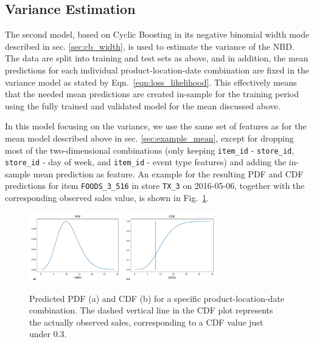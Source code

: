 \documentclass[BCOR=1mm, DIV=calc,10pt,
twoside=true,
twocolumn,
headings=normal]{scrartcl}
\newcommand{\fig}{Fig.~}
\newcommand{\eqn}{Eqn.~}
\begin{document}
\subsection{Variance Estimation}

The second model, based on Cyclic Boosting in its negative binomial width mode described in sec. \ref{sec:cb_width}, is used to estimate the variance of the NBD. The data are split into training and test sets as above, and in addition, the mean predictions for each individual product-location-date combination are fixed in the variance model as stated by \eqn \eqref{eqn:loss_likelihood}. This effectively means that the needed mean predictions are created in-sample for the training period using the fully trained and validated model for the mean discussed above.

\noindent
In this model focusing on the variance, we use the same set of features as for the mean model described above in sec. \ref{sec:example_mean}, except for dropping most of the two-dimensional combinations (only keeping \texttt{item\_id} - \texttt{store\_id}, \texttt{store\_id} - day of week, and \texttt{item\_id} - event type features) and adding the in-sample mean prediction as feature. An example for the resulting PDF and CDF predictions for item \texttt{FOODS\_3\_516} in store \texttt{TX\_3} on 2016-05-06, together with the corresponding observed sales value, is shown in \fig \ref{fig:pdf_example}.

\begin{figure}
\begin{center}
\includegraphics[width=4cm]{figs/pdf}
\includegraphics[width=4cm]{figs/cdf}
\caption{\label{fig:pdf_example} Predicted PDF (a) and CDF (b) for a specific product-location-date combination. The dashed vertical line in the CDF plot represents the actually observed sales, corresponding to a CDF value just under $0.3$.}
\end{center}
\end{figure}
\end{document}
